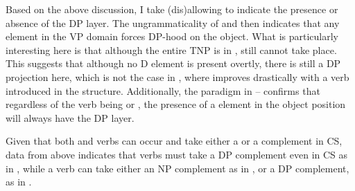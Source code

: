 \documentclass[output=paper,hidelinks,newtxmath,]{langscibook}
\begin{document}
\ea \label{15:ex18}
	\z
\z

\ea \label{15:ex19}
	\z
\z

\noindent Based on the above discussion, I take (dis)allowing  to indicate the presence or absence of the DP layer. The ungrammaticality of  and  then indicates that any  element in the VP domain forces DP-hood on the object. What is particularly interesting here is that although the entire TNP is in ,  still cannot take place. This suggests that although no  D element is present overtly, there is still a DP projection here, which is not the case in , where  improves drastically with a  verb introduced in the structure. Additionally, the paradigm in -- confirms that regardless of the verb being  or , the presence of a  element in the object position will always have the DP layer.

Given that both  and  verbs can occur and take either a  or a  complement in CS, data from above indicates that  verbs must take a DP complement even in CS as in , while a  verb can take either an NP complement as in , or a DP complement, as in .
\end{document}
